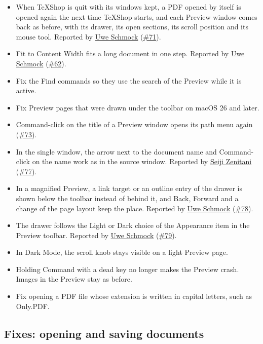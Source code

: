 \documentclass[11pt,letterpaper]{article}
\begin{document}
\begin{itemize}
\item When TeXShop is quit with its windows kept, a PDF opened by itself is opened again the next time TeXShop starts, and each Preview window comes back as before, with its drawer, its open sections, its scroll position and its mouse tool. Reported by \href{https://github.com/Uwe-Schmock}{Uwe Schmock} (\href{https://github.com/TeXShopProject/TeXShop/issues/71}{\#71}).
\item Fit to Content Width fits a long document in one step. Reported by \href{https://github.com/Uwe-Schmock}{Uwe Schmock} (\href{https://github.com/TeXShopProject/TeXShop/issues/62}{\#62}).
\item Fix the Find commands so they use the search of the Preview while it is active.
\item Fix Preview pages that were drawn under the toolbar on macOS 26 and later.
\item Command-click on the title of a Preview window opens its path menu again (\href{https://github.com/TeXShopProject/TeXShop/issues/73}{\#73}).
\item In the single window, the arrow next to the document name and Command-click on the name work as in the source window. Reported by \href{https://github.com/zenitani}{Seiji Zenitani} (\href{https://github.com/TeXShopProject/TeXShop/issues/77}{\#77}).
\item In a magnified Preview, a link target or an outline entry of the drawer is shown below the toolbar instead of behind it, and Back, Forward and a change of the page layout keep the place. Reported by \href{https://github.com/Uwe-Schmock}{Uwe Schmock} (\href{https://github.com/TeXShopProject/TeXShop/issues/78}{\#78}).
\item The drawer follows the Light or Dark choice of the Appearance item in the Preview toolbar. Reported by \href{https://github.com/Uwe-Schmock}{Uwe Schmock} (\href{https://github.com/TeXShopProject/TeXShop/issues/79}{\#79}).
\item In Dark Mode, the scroll knob stays visible on a light Preview page.
\item Holding Command with a dead key no longer makes the Preview crash. Images in the Preview stay as before.
\item Fix opening a PDF file whose extension is written in capital letters, such as Only.PDF.
\end{itemize}

\subsection{Fixes: opening and saving documents}
\end{document}

